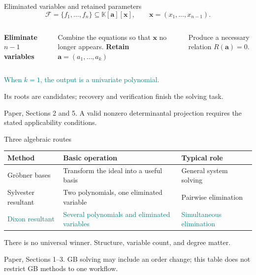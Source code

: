 \documentclass[aspectratio=169,11pt,professionalfonts]{beamer}
\newcommand{\src}[1]{\vfill{\color{Muted}\fontsize{7}{8.5}\selectfont #1\par}}
\newcommand{\gap}{\par\vspace{3mm}}
\newcommand{\F}{\mathcal F}
\newcommand{\xx}{\mathbf x}
\newcommand{\avec}{\mathbf a}
\begin{document}
\begin{frame}{Eliminated variables and retained parameters}
\[\F=\{f_1,\ldots,f_n\}\subseteq\mathbb K[\avec][\xx],\qquad\xx=(x_1,\ldots,x_{n-1}).\]
\begin{columns}[T,onlytextwidth]
\textbf{Eliminate $n-1$ variables}\gap
Combine the equations so that $\xx$ no longer appears.
\textbf{Retain $\avec=(a_1,\ldots,a_k)$}\gap
Produce a necessary relation $R(\avec)=0$.
\end{columns}\vspace{6mm}
\textcolor{Teal}{When $k=1$, the output is a univariate polynomial.}\gap
Its roots are candidates; recovery and verification finish the solving task.
\src{Paper, Sections 2 and 5. A valid nonzero determinantal projection requires the stated applicability conditions.}
\end{frame}

\begin{frame}{Three algebraic routes}
\renewcommand{\arraystretch}{1.8}
\begin{tabular}{@{}L{2.7cm}L{5.5cm}L{4.4cm}@{}}
\toprule\textbf{Method}&\textbf{Basic operation}&\textbf{Typical role}\\\midrule
Gr\"obner bases&Transform the ideal into a useful basis&General system solving\\
Sylvester resultant&Two polynomials, one eliminated variable&Pairwise elimination\\
\textcolor{Teal}{Dixon resultant}&\textcolor{Teal}{Several polynomials and eliminated variables}&\textcolor{Teal}{Simultaneous elimination}\\\bottomrule
\end{tabular}\par\vspace{5mm}
There is no universal winner. Structure, variable count, and degree matter.
\src{Paper, Sections 1--3. GB solving may include an order change; this table does not restrict GB methods to one workflow.}
\end{frame}
\end{document}
